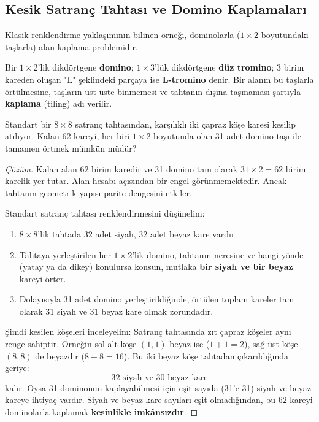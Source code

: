\subsection{Kesik Satranç Tahtası ve Domino Kaplamaları}

Klasik renklendirme yaklaşımının bilinen örneği, dominolarla ($1 \times 2$ boyutundaki taşlarla) alan kaplama problemidir.

\begin{definition}
Bir $1 \times 2$'lik dikdörtgene \textbf{domino}; $1 \times 3$'lük dikdörtgene \textbf{düz tromino}; 3 birim kareden oluşan "L" şeklindeki parçaya ise \textbf{L-tromino} denir. Bir alanın bu taşlarla örtülmesine, taşların üst üste binmemesi ve tahtanın dışına taşmaması şartıyla \textbf{kaplama} (tiling) adı verilir.
\end{definition}

\begin{example}
Standart bir $8 \times 8$ satranç tahtasından, karşılıklı iki çapraz köşe karesi kesilip atılıyor. Kalan 62 kareyi, her biri $1 \times 2$ boyutunda olan 31 adet domino taşı ile tamamen örtmek mümkün müdür?
\end{example}

\begin{proof}[Çözüm]
Kalan alan $62$ birim karedir ve 31 domino tam olarak $31 \times 2 = 62$ birim karelik yer tutar. Alan hesabı açısından bir engel görünmemektedir. Ancak tahtanın geometrik yapısı parite dengesini etkiler.

Standart satranç tahtası renklendirmesini düşünelim:
\begin{enumerate}
    \item $8 \times 8$'lik tahtada 32 adet siyah, 32 adet beyaz kare vardır.
    \item Tahtaya yerleştirilen her $1 \times 2$'lik domino, tahtanın neresine ve hangi yönde (yatay ya da dikey) konulursa konsun, mutlaka \textbf{bir siyah ve bir beyaz} kareyi örter.
    \item Dolayısıyla 31 adet domino yerleştirildiğinde, örtülen toplam kareler tam olarak 31 siyah ve 31 beyaz kare olmak zorundadır.
\end{enumerate}

Şimdi kesilen köşeleri inceleyelim:
Satranç tahtasında zıt çapraz köşeler aynı renge sahiptir. Örneğin sol alt köşe $(1, 1)$ beyaz ise ($1+1=2$), sağ üst köşe $(8, 8)$ de beyazdır ($8+8=16$). 
Bu iki beyaz köşe tahtadan çıkarıldığında geriye:
\[
32 \text{ siyah ve } 30 \text{ beyaz kare}
\]
kalır. Oysa 31 dominonun kaplayabilmesi için eşit sayıda (31'e 31) siyah ve beyaz kareye ihtiyaç vardır. Siyah ve beyaz kare sayıları eşit olmadığından, bu 62 kareyi dominolarla kaplamak \textbf{kesinlikle imkânsızdır}.
\end{proof}

